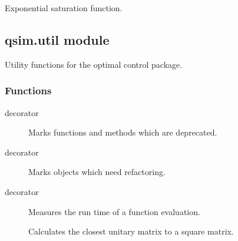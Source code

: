 \documentclass[letterpaper,10pt,english]{sphinxmanual}
\begin{document}

\begin{fulllineitems}
\label{\detokenize{qsim:qsim.transfer_function.exp_saturation}}
Exponential saturation function.

\end{fulllineitems}



\subsection{qsim.util module}
\label{\detokenize{qsim:module-qsim.util}}\label{\detokenize{qsim:qsim-util-module}}
Utility functions for the optimal control package.


\subsubsection{Functions}
\label{\detokenize{qsim:id48}}\begin{description}
\item[{{\hyperref[\detokenize{qsim:qsim.util.deprecated}]{}} decorator}] \leavevmode
Marks functions and methods which are deprecated.

\item[{{\hyperref[\detokenize{qsim:qsim.util.needs_refactoring}]{}} decorator}] \leavevmode
Marks objects which need refactoring.

\item[{{\hyperref[\detokenize{qsim:qsim.util.timeit}]{}} decorator}] \leavevmode
Measures the run time of a function evaluation.

\item[{{\hyperref[\detokenize{qsim:qsim.util.closest_unitary}]{}}}] \leavevmode
Calculates the closest unitary matrix to a square matrix.

\end{description}
\end{document}
